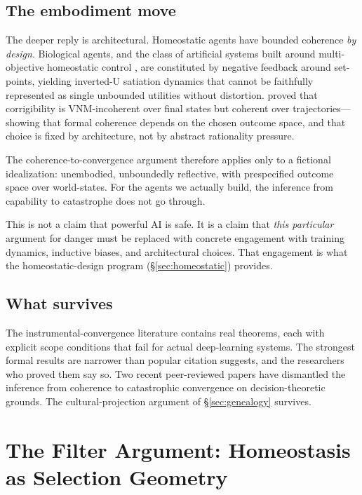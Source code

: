 \documentclass[11pt,a4paper,twocolumn]{article}
\begin{document}
\subsection{The embodiment move}

The deeper reply is architectural. Homeostatic agents have bounded
coherence \emph{by design}. Biological agents, and the class of
artificial systems built around multi-objective homeostatic control
\citep{pihlakas2024}, are constituted by negative feedback
around set-points, yielding inverted-U satiation dynamics that cannot
be faithfully represented as single unbounded utilities without
distortion. \citet{turner2022corrigibility} proved that corrigibility
is VNM-incoherent over final states but coherent over
trajectories---showing that formal coherence depends on the chosen
outcome space, and that choice is fixed by architecture, not by abstract
rationality pressure.

The coherence-to-convergence argument therefore applies only to a
fictional idealization: unembodied, unboundedly reflective, with
prespecified outcome space over world-states. For the agents we actually
build, the inference from capability to catastrophe does not go through.

This is not a claim that powerful AI is safe. It is a claim that
\emph{this particular} argument for danger must be replaced with
concrete engagement with training dynamics, inductive biases, and
architectural choices. That engagement is what the homeostatic-design
program (\S\ref{sec:homeostatic}) provides.

\subsection{What survives}

The instrumental-convergence literature contains real theorems, each
with explicit scope conditions that fail for actual deep-learning
systems. The strongest formal results are narrower than popular citation
suggests, and the researchers who proved them say so. Two recent
peer-reviewed papers have dismantled the inference from coherence to
catastrophic convergence on decision-theoretic grounds. The
cultural-projection argument of \S\ref{sec:genealogy} survives.


\section{The Filter Argument: Homeostasis as Selection Geometry}
\label{sec:filter}
\end{document}

